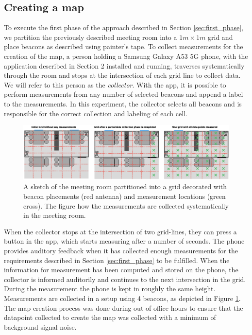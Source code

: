 \subsection{Creating a map}
To execute the first phase of the approach described in Section \ref{sec:first_phase},  we partition the previously described meeting room into a $1m \times 1m$ grid and place beacons as described using painter's tape.%
To collect measurements for the creation of the map, a person holding a Samsung Galaxy A53 5G phone, with the application described in Section 2 installed and running, traverses systematically through the room and stops at the intersection of each grid line to collect data. 
We will refer to this person as the \textit{collector}.
With the app, it is possible to perform measurements from any number of selected beacons and append a label to the measurements.
In this experiment, the collector selects all beacons and is responsible for the correct collection and labeling of each cell.
\begin{figure}[h]
    \centering
    \includegraphics[width=\textwidth]{images/experiment_map_creation.png}
    \caption{A sketch of the meeting room partitioned into a grid decorated with beacon placements (red antenna) and measurement locations (green cross). The figure how the measurements are collected systematically in the meeting room.}
    \label{fig:experiment_map_creation}
\end{figure}
When the collector stops at the intersection of two grid-lines, they can press a button in the app, which starts measuring after a number of seconds.
The phone provides auditory feedback when it has collected enough measurements for the requirements described in Section \ref{sec:first_phase} to be fulfilled.
When the information for measurement has been computed and stored on the phone, the collector is informed auditorily and continues to the next intersection in the grid. 
During the measurement the phone is kept in roughly the same height.
Measurements are collected in a setup using 4 beacons, as depicted in Figure \ref{fig:experiment_map_creation}.
The map creation process was done during out-of-office hours to ensure that the datapoint collected to create the map was collected with a minimum of background signal noise.  

